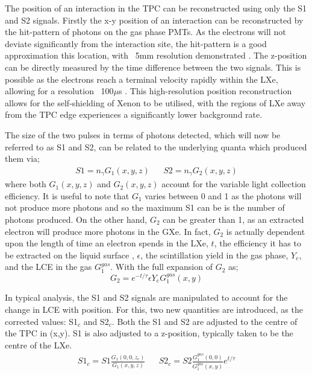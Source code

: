 \par
The position of an interaction in the TPC can be reconstructed using only the S1 and S2 signals.
Firstly the x-y position of an interaction can be reconstructed by the hit-pattern of photons on the gas phase PMTs. 
As the electrons will not deviate significantly from the interaction site, the hit-pattern is a good approximation this location, with ~5mm resolution demonstrated \cite{lux_position_reconstruction_ref}.
The z-position can be directly measured by the time difference between the two signals.
This is possible as the electrons reach a terminal velocity rapidly within the LXe, allowing for a resolution ~100$\mu$s \cite{LZ_TechnicalDesignReview_ref}.
This high-resolution position reconstruction allows for the self-shielding of Xenon to be utilised, with the regions of LXe away from the TPC edge experiences a significantly lower background rate.

\par
The size of the two pulses in terms of photons detected, which will now be referred to as S1 and S2, can be related to the underlying quanta which produced them via;
\begin{align}
    S1 = n_\gamma G_1(x,y,z) && S2 = n_\gamma G_2(x,y,z)
\end{align}
where both $G_1(x,y,z)$ and $G_2(x,y,z)$ account for the variable light collection efficiency.
It is useful to note that $G_1$ varies between 0 and 1 as the photons will not produce more photons and so the maximum S1 can be is the number of photons produced.
On the other hand, $G_2$ can be greater than 1, as an extracted electron will produce more photons in the GXe.
In fact, $G_2$ is actually dependent upon the length of time an electron spends in the LXe, $t$, the efficiency it has to be extracted on the liquid surface , $\epsilon$, the scintillation yield in the gas phase, $Y_e$, and the LCE in the gas $G_1^{gas}$.
With the full expansion of $G_2$ as;
\begin{equation}
    G_2 = e^{-t/\tau} \epsilon Y_e G_1^{gas}(x,y)
\end{equation}

\par
In typical analysis, the S1 and S2 signals are manipulated to account for the change in LCE with position.
For this, two new quantities are introduced, as the corrected values: S1$_c$ and S2$_c$.
Both the S1 and S2 are adjusted to the centre of the TPC in (x,y).
S1 is also adjusted to a z-position, typically taken to be the centre of the LXe.
\begin{align}
    S1_c = S1 \frac{G_1(0,0,z_c)}{G_1(x,y,z)} && S2_c = S2 \frac{G_1^{gas}(0,0)}{G_1^{gas}(x,y)} e^{t/\tau}
    \label{eq:s1c_and_s2c_full}
\end{align}

